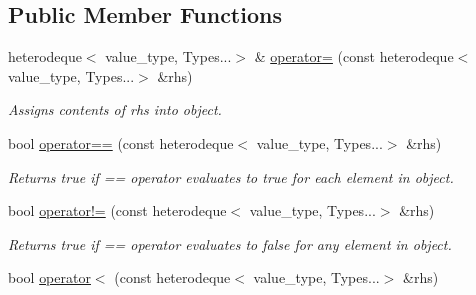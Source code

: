 \subsection*{Public Member Functions}
\begin{DoxyCompactItemize}
\item 
\hypertarget{classheterogeneous_1_1heterodeque_3_01_t_00_01_types_8_8_8_4_ae144295e6aaeb3feed23643bdadc48b2}{}heterodeque$<$ value\+\_\+type, Types...$>$ \& \hyperlink{classheterogeneous_1_1heterodeque_3_01_t_00_01_types_8_8_8_4_ae144295e6aaeb3feed23643bdadc48b2}{operator=} (const heterodeque$<$ value\+\_\+type, Types...$>$ \&rhs)\label{classheterogeneous_1_1heterodeque_3_01_t_00_01_types_8_8_8_4_ae144295e6aaeb3feed23643bdadc48b2}

\begin{DoxyCompactList}\small\item\em Assigns contents of rhs into object. \end{DoxyCompactList}\item 
\hypertarget{classheterogeneous_1_1heterodeque_3_01_t_00_01_types_8_8_8_4_a260d88998538f1c5e4d9cfbd7190f508}{}bool \hyperlink{classheterogeneous_1_1heterodeque_3_01_t_00_01_types_8_8_8_4_a260d88998538f1c5e4d9cfbd7190f508}{operator==} (const heterodeque$<$ value\+\_\+type, Types...$>$ \&rhs)\label{classheterogeneous_1_1heterodeque_3_01_t_00_01_types_8_8_8_4_a260d88998538f1c5e4d9cfbd7190f508}

\begin{DoxyCompactList}\small\item\em Returns true if == operator evaluates to true for each element in object. \end{DoxyCompactList}\item 
\hypertarget{classheterogeneous_1_1heterodeque_3_01_t_00_01_types_8_8_8_4_a85e7b184bfa259f6fbc8483eb9bac0db}{}bool \hyperlink{classheterogeneous_1_1heterodeque_3_01_t_00_01_types_8_8_8_4_a85e7b184bfa259f6fbc8483eb9bac0db}{operator!=} (const heterodeque$<$ value\+\_\+type, Types...$>$ \&rhs)\label{classheterogeneous_1_1heterodeque_3_01_t_00_01_types_8_8_8_4_a85e7b184bfa259f6fbc8483eb9bac0db}

\begin{DoxyCompactList}\small\item\em Returns true if == operator evaluates to false for any element in object. \end{DoxyCompactList}\item 
\hypertarget{classheterogeneous_1_1heterodeque_3_01_t_00_01_types_8_8_8_4_a0bb7480188534ec2ae46a10f787c82d3}{}bool \hyperlink{classheterogeneous_1_1heterodeque_3_01_t_00_01_types_8_8_8_4_a0bb7480188534ec2ae46a10f787c82d3}{operator$<$} (const heterodeque$<$ value\+\_\+type, Types...$>$ \&rhs)\label{classheterogeneous_1_1heterodeque_3_01_t_00_01_types_8_8_8_4_a0bb7480188534ec2ae46a10f787c82d3}


\end{DoxyCompactItemize}
